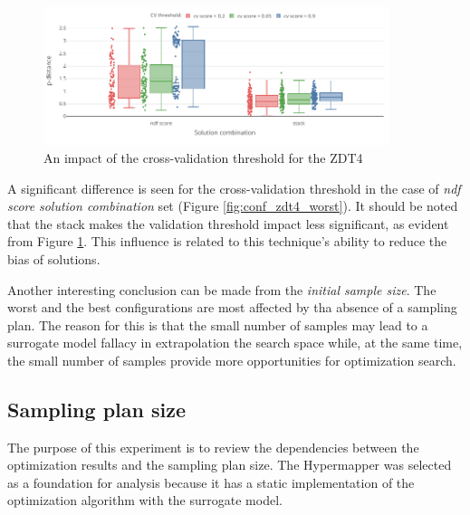         \begin{figure}[h!]
            \centering
            \includegraphics[width=0.90\textwidth]{content/images/conf_zdt4_cv_score}
            \caption[An impact of the cross-validation threshold for the ZDT4]{An impact of the cross-validation threshold for the ZDT4} 
            \label{fig:conf_zdt4_sign}    
        \end{figure}


    A significant difference is seen for the cross-validation threshold in the case of \textit{ndf score} \emph{solution combination} set (Figure \ref{fig:conf_zdt4_worst}). It should be noted that the stack makes the validation threshold impact less significant, as evident from Figure \ref{fig:conf_zdt4_sign}. This influence is related to this technique's ability to reduce the bias of solutions. 
    
    Another interesting conclusion can be made from the \emph{initial sample size}. The worst and the best configurations are most affected by tha absence of a sampling plan. The reason for this is that the small number of samples may lead to a surrogate model fallacy in extrapolation the search space while, at the same time, the small number of samples provide more opportunities for optimization search.

    \subsection{Sampling plan size}
    The purpose of this experiment is to review the dependencies between the optimization results and the sampling plan size. The Hypermapper was selected as a foundation for analysis because it has a static implementation of the optimization algorithm with the surrogate model.

